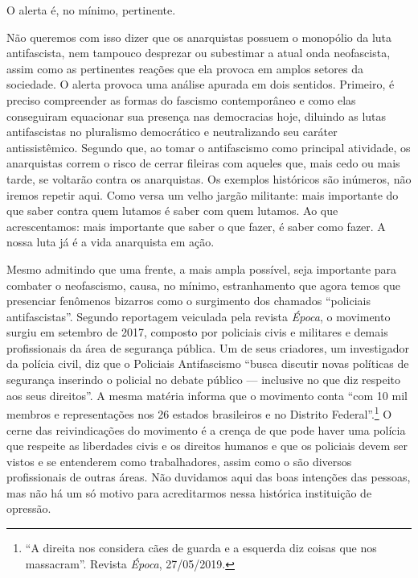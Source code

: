 O alerta é, no mínimo, pertinente.

Não queremos com isso dizer que os anarquistas possuem o monopólio da luta antifascista, nem tampouco desprezar ou subestimar a atual onda neofascista, assim como as pertinentes reações que ela provoca em amplos setores da sociedade. O alerta provoca uma análise apurada em dois sentidos. Primeiro, é preciso compreender as formas do fascismo contemporâneo e como elas conseguiram equacionar sua presença nas democracias hoje, diluindo as lutas antifascistas no pluralismo democrático e neutralizando seu caráter antissistêmico. Segundo que, ao tomar o antifascismo como principal atividade, os anarquistas correm o risco de cerrar fileiras com aqueles que, mais cedo ou mais tarde, se voltarão contra os anarquistas. Os exemplos históricos são inúmeros, não iremos repetir aqui. Como versa um velho jargão militante: mais importante do que saber contra quem lutamos é saber com quem lutamos. Ao que acrescentamos: mais importante que saber o que fazer, é saber como fazer. A nossa luta já é a vida anarquista em ação.

Mesmo admitindo que uma frente, a mais ampla possível, seja importante para combater o neofascismo, causa, no mínimo, estranhamento que agora temos que presenciar fenômenos bizarros como o surgimento dos chamados ``policiais antifascistas''. Segundo reportagem veiculada pela revista \emph{Época}, o movimento surgiu em setembro de 2017, composto por policiais civis e militares e demais profissionais da área de segurança pública. Um de seus criadores, um investigador da polícia civil, diz que o Policiais Antifascismo ``busca discutir novas políticas de segurança inserindo o policial no debate público — inclusive no que diz respeito aos seus direitos''. A mesma matéria informa que o movimento conta ``com 10 mil membros e representações nos 26 estados brasileiros e no Distrito Federal''.\footnote{``A direita nos considera cães de guarda e a esquerda diz coisas que nos massacram''. Revista \emph{Época}, 27/05/2019.} O cerne das reivindicações do movimento é a crença de que pode haver uma polícia que respeite as liberdades civis e os direitos humanos e que os policiais devem ser vistos e se entenderem como trabalhadores, assim como o são diversos profissionais de outras áreas. Não duvidamos aqui das boas intenções das pessoas, mas não há um só motivo para acreditarmos nessa histórica instituição de opressão.

